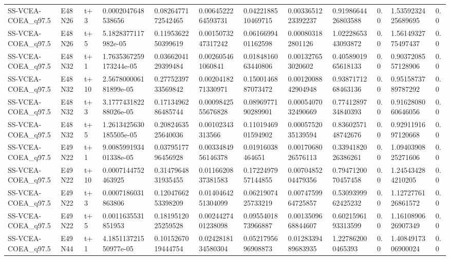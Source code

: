 \begin{landscape}
\begin{longtable}{llllllllllll}
SS-VCEA-COEA\_q97.5 & E48N26 & t+3 & 0.0002047648538656 & 0.0826477172542465 & 0.0064522264593731 & 0.0422188510469715 & 0.0033651223392237 & 0.9198664426803588 & 0.0 & 1.5359232425689695 & 0.0 \\
SS-VCEA-COEA\_q97.5 & E48N26 & t+5 & 5.1828377117982e-05 & 0.1195362250399619 & 0.0015073247317242 & 0.0616699401162598 & 0.000803182801126 & 1.0222865343093872 & 0.0 & 1.5614932775497437 & 0.0 \\
SS-VCEA-COEA\_q97.5 & E48N32 & t+1 & 1.7635367259173244e-05 & 0.0366204129399484 & 0.002605461060841 & 0.0184816063440806 & 0.001327653020602 & 0.4058901965618133 & 0.0 & 0.9037208557128906 & 0.0 \\
SS-VCEA-COEA\_q97.5 & E48N32 & t+10 & 2.567800006181899e-05 & 0.2775239733569842 & 0.0020418271330971 & 0.1500146887073472 & 0.0012008842904948 & 0.9387171268463136 & 0.0 & 0.9515873789787292 & 0.0 \\
SS-VCEA-COEA\_q97.5 & E48N32 & t+3 & 3.177743182288026e-05 & 0.1713496286485744 & 0.0009842555676828 & 0.0896977190289901 & 0.0005407032490669 & 0.7741289734840393 & 0.0 & 0.9162808060646056 & 0.0 \\
SS-VCEA-COEA\_q97.5 & E48N32 & t+5 & 1.2613425630185505e-05 & 0.2082463525640036 & 0.00102343313566 & 0.1101946901594902 & 0.0005752035139594 & 0.8360257148742676 & 0.0 & 0.9291191697120668 & 0.0 \\
SS-VCEA-COEA\_q97.5 & E49N22 & t+1 & 9.008599193401338e-05 & 0.0379517796456928 & 0.0033484956146378 & 0.01916038464651 & 0.0017068026576113 & 0.3394182026386261 & 0.0 & 1.0940390825271606 & 0.0 \\
SS-VCEA-COEA\_q97.5 & E49N22 & t+10 & 0.0007144752463925 & 0.3147964831935455 & 0.0116620837381583 & 0.1722497957144855 & 0.0070485204479356 & 0.7947120070457458 & 0.0 & 1.245434284210205 & 0.0 \\
SS-VCEA-COEA\_q97.5 & E49N22 & t+3 & 0.0007186031863806 & 0.1204766253398209 & 0.0140464251304099 & 0.0621907425733219 & 0.0074759964725857 & 0.5309399962425232 & 0.0 & 1.1272776126861572 & 0.0 \\
SS-VCEA-COEA\_q97.5 & E49N22 & t+5 & 0.0011635531851953 & 0.1819512025259528 & 0.0024427401238098 & 0.0955401873966887 & 0.0013509668844607 & 0.6021596193313599 & 0.0 & 1.1610890626907349 & 0.0 \\
SS-VCEA-COEA\_q97.5 & E49N44 & t+1 & 4.185113721550977e-05 & 0.1015267019444754 & 0.0242818134580304 & 0.0521795696908873 & 0.0128339489683935 & 1.227862000465393 & 0.0 & 1.4084917306900024 & 0.0 \\

\end{longtable}
\end{landscape}
